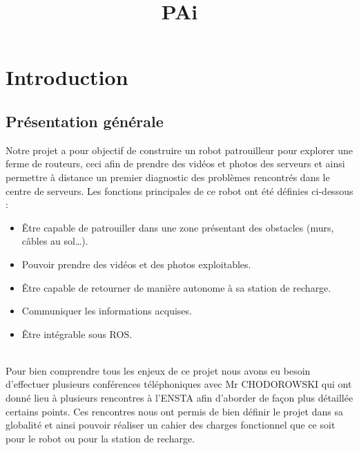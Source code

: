\documentclass[french]{rapportENSTAB}
\title{PAi} %
\begin{document}





        
\fairemarges %
\fairepagedegarde %
\tableofcontents
\newpage

\section{Introduction} 
\subsection{Présentation générale} 
Notre projet a pour objectif de construire un robot patrouilleur pour explorer une ferme de routeurs, ceci afin de prendre des vidéos et photos des serveurs et ainsi permettre à distance un premier diagnostic des problèmes rencontrés dans le centre de serveurs. Les fonctions principales de ce robot ont été définies ci-dessous :\begin{itemize}[label=\textbullet, font=\small\color{blue}]
    \item Être capable de patrouiller dans une zone présentant des obstacles (murs, câbles au sol…).
    \item Pouvoir prendre des vidéos et des photos exploitables.
    \item Être capable de retourner de manière autonome à sa station de recharge.
    \item Communiquer les informations acquises.
    \item Être intégrable sous ROS.
\end{itemize}\\


Pour bien comprendre tous les enjeux de ce projet nous avons eu besoin d’effectuer plusieurs conférences téléphoniques avec Mr CHODOROWSKI qui ont donné lieu à plusieurs rencontres à l’ENSTA afin d’aborder de façon plus détaillée certains points. Ces rencontres nous ont permis de bien définir le projet dans sa globalité et ainsi pouvoir réaliser un cahier des charges fonctionnel que ce soit pour le robot ou pour la station de recharge.\\
\end{document}

